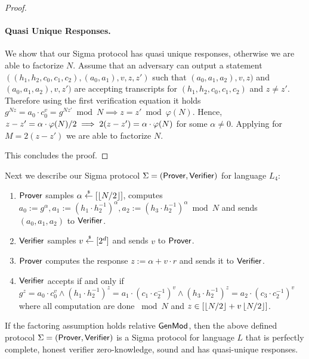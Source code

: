 \begin{proof}
\paragraph{Quasi Unique Responses.} We show that our Sigma protocol has quasi unique responses, otherwise we are able to factorize $N$. Assume that an adversary can output a statement $((h_1, h_2, c_0, c_1, c_2), (a_0, a_1), v, z, z')$ such that $(a_0, a_1, a_2), v, z)$ and $(a_0, a_1, a_2), v, z')$ are accepting transcripts for $(h_1, h_2, c_0, c_1, c_2)$ and $z \neq z'$. Therefore using the first verification equation it holds $g^{Nz} = a_0 \cdot c_0^v = g^{Nz'} \bmod N \implies z = z' \bmod \varphi(N)$. Hence, $z-z' = \alpha \cdot \varphi(N)/2 \implies 2(z-z') = \alpha \cdot \varphi(N) $ for some $\alpha \neq 0$. Applying  for $M=2(z-z')$ we are able to factorize $N$.

This concludes the proof.
\end{proof}

Next we describe our Sigma protocol $\Sigma = (\mathsf{Prover}, \mathsf{Verifier})$ for language $L_4$:
\begin{enumerate}
\item $\mathsf{Prover}$ samples $\alpha \stackrel{{\scriptscriptstyle\$}}{\leftarrow} [\left\lfloor N/2 \right\rfloor]$, computes $a_0:=g^\alpha, a_1:= (h_1\cdot h_2^{-1})^\alpha, a_2:= (h_3\cdot h_2^{-1})^\alpha \bmod N$ and sends $(a_0, a_1, a_2)$ to $\mathsf{Verifier}$.
\item $\mathsf{Verifier}$ samples $v \stackrel{{\scriptscriptstyle\$}}{\leftarrow} [2^d]$ and sends $v$ to $\mathsf{Prover}$.
\item $\mathsf{Prover}$ computes the response $z:= \alpha + v \cdot r$ and sends it to $\mathsf{Verifier}$.
\item $\mathsf{Verifier}$ accepts if and only if $g^z = a_0 \cdot c_0^v \land (h_1\cdot h_2^{-1})^z = a_1 \cdot (c_1\cdot c_2^{-1})^v  \land (h_3\cdot h_2^{-1})^z = a_2 \cdot (c_3\cdot c_2^{-1})^v$ where all computation are done $\bmod N$ and $z \in [\left\lfloor N/2 \right\rfloor + v\left\lfloor N/2 \right\rfloor]$.
\end{enumerate}

\begin{theorem}
If the factoring assumption holds relative $\mathsf{GenMod}$, then the above defined protocol $\Sigma = (\mathsf{Prover}, \mathsf{Verifier})$ is a Sigma protocol for language $L$ that is perfectly complete, honest verifier zero-knowledge, sound and has quasi-unique responses. 
\end{theorem}

